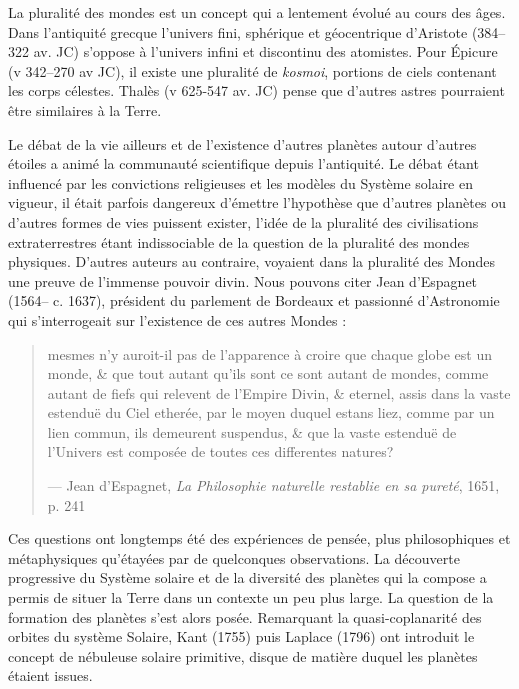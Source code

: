 La pluralité des mondes est un concept qui a lentement évolué au cours des âges. Dans l'antiquité grecque l'univers fini, sphérique et géocentrique d'Aristote (384--322 av. JC) s'oppose à l'univers infini et discontinu des atomistes. Pour Épicure (v 342--270 av JC), il existe une pluralité de \textit{kosmoi}, portions de ciels contenant les corps célestes. Thalès (v 625-547 av. JC) pense que d'autres astres pourraient être similaires à la Terre. 

Le débat de la vie ailleurs et de l'existence d'autres planètes autour d'autres étoiles a animé la communauté scientifique
depuis l'antiquité. Le débat étant influencé par les convictions religieuses et les modèles du Système solaire en vigueur, il était
parfois dangereux d'émettre l'hypothèse que d'autres planètes ou d'autres formes de vies puissent exister, l'idée de la
pluralité des civilisations extraterrestres étant indissociable de la question de la pluralité des mondes physiques. D'autres auteurs au contraire, voyaient dans la pluralité des Mondes une preuve de l'immense pouvoir divin. Nous pouvons citer Jean d'Espagnet (1564-- c. 1637), président du parlement de Bordeaux et passionné d'Astronomie qui s'interrogeait sur l'existence de ces autres Mondes :
\begin{quote}
\og mesmes n'y auroit-il pas de l'apparence à croire que chaque globe est un monde, \& que tout autant qu'ils sont ce sont
autant de mondes, comme autant de fiefs qui relevent de l'Empire Divin, \& eternel, assis dans la vaste estenduë du Ciel
etherée, par le moyen duquel estans liez, comme par un lien commun, ils demeurent suspendus, \& que la vaste estenduë de
l'Univers est composée de toutes ces differentes natures?\fg 

--- Jean d'Espagnet, \textit{La Philosophie naturelle restablie en sa pureté}, 1651, p. 241 \cite{espagnet1651philosophie}
\end{quote}

Ces questions ont longtemps été des expériences de pensée, plus philosophiques et métaphysiques qu'étayées par de quelconques
observations. La découverte progressive du Système solaire et de la diversité des planètes qui la compose a permis de situer la
Terre dans un contexte un peu plus large. La question de la formation des planètes s'est alors posée. Remarquant la quasi-coplanarité des orbites du système Solaire, Kant (1755) puis Laplace (1796) ont introduit le concept de nébuleuse solaire
primitive, disque de matière duquel les planètes étaient issues. 

